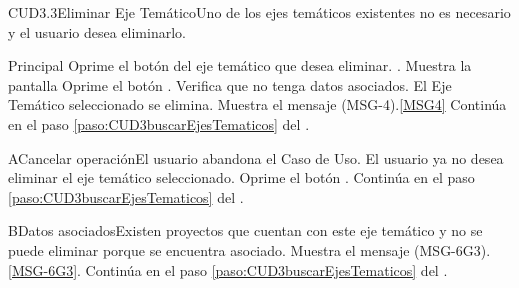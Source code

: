 	\begin{UseCase}{CUD3.3}{Eliminar Eje Temático}{Uno de los ejes temáticos existentes no es necesario y el usuario desea eliminarlo.}
	\end{UseCase}

	\begin{UCtrayectoria}{Principal}
			\UCpaso[\UCactor] Oprime el botón  del eje temático que desea eliminar.
			.
			\UCpaso Muestra la pantalla   
			\UCpaso [\UCactor] Oprime el botón .
			\UCpaso Verifica que no tenga datos asociados.  
			\UCpaso El Eje Temático seleccionado se elimina.
			\UCpaso Muestra el mensaje (MSG-4).\ref{MSG4}
			\UCpaso Continúa en el paso \ref{paso:CUD3buscarEjesTematicos} del .
	\end{UCtrayectoria}

		\begin{UCtrayectoriaA}{A}{Cancelar operación}{El usuario abandona el Caso de Uso.}
			\UCpaso[\UCactor] El usuario ya no desea eliminar el eje temático seleccionado.
			\UCpaso[\UCactor] Oprime el botón .
			\UCpaso Continúa en el paso \ref{paso:CUD3buscarEjesTematicos} del .
		\end{UCtrayectoriaA}

		 \begin{UCtrayectoriaA}{B}{Datos asociados}{Existen proyectos que cuentan con este eje temático y no se puede eliminar porque se encuentra asociado.}
			\UCpaso Muestra el mensaje (MSG-6G3).\ref{MSG-6G3}.
			\UCpaso Continúa en el paso \ref{paso:CUD3buscarEjesTematicos} del .
		\end{UCtrayectoriaA}
